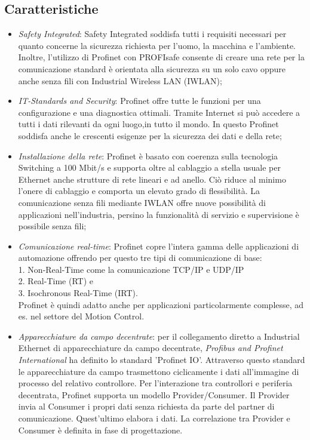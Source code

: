 \documentclass[12pt, a4paper, oneside]{book}
\begin{document}
\subsection{Caratteristiche}
\begin{itemize}
	\item \textit{Safety Integrated}: Safety Integrated soddisfa tutti i requisiti necessari per quanto concerne la sicurezza richiesta per l'uomo, la macchina e l'ambiente. Inoltre, l'utilizzo di Profinet con PROFIsafe consente di creare una rete per la comunicazione standard è orientata alla sicurezza su un solo cavo oppure anche senza fili con Industrial Wireless LAN (IWLAN);
	\item \textit{IT-Standards and Security}: Profinet offre tutte le funzioni per una configurazione e una diagnostica ottimali. Tramite Internet si può accedere a tutti i dati rilevanti da ogni luogo,in tutto il mondo. In questo Profinet soddisfa anche le crescenti esigenze per la sicurezza dei dati e della rete;
	\item \textit{Installazione della rete}: Profinet è basato con coerenza sulla tecnologia Switching a 100 Mbit/s e supporta oltre al cablaggio a stella usuale per Ethernet anche strutture di rete lineari e ad anello. Ciò riduce al minimo l'onere di cablaggio e comporta un elevato grado di flessibilità. La comunicazione senza fili mediante IWLAN offre nuove possibilità di applicazioni nell'industria, persino la funzionalità di servizio e supervisione è possibile senza fili;
	\item \textit{Comunicazione real-time}: Profinet copre l'intera gamma delle applicazioni di automazione offrendo per questo tre tipi di comunicazione di base:
	\\1. Non-Real-Time come la comunicazione TCP/IP e UDP/IP
	\\2. Real-Time (RT) e
	\\3. Isochronous Real-Time (IRT). 
	\\Profinet è quindi adatto anche per applicazioni particolarmente complesse, ad es. nel settore del Motion Control.
	\item \textit{Apparecchiature da campo decentrate}: per il collegamento diretto a Industrial Ethernet di apparecchiature da campo decentrate, \textit{Profibus and Profinet International} ha definito lo standard 'Profinet IO'. Attraverso questo standard le apparecchiature da campo trasmettono ciclicamente i dati all'immagine di processo del relativo controllore. Per l'interazione tra controllori e periferia decentrata, Profinet supporta un modello Provider/Consumer. Il Provider invia al Consumer i propri dati senza richiesta da parte del partner di comunicazione. Quest'ultimo elabora i dati. La correlazione tra Provider e Consumer è definita in fase di progettazione.

\end{itemize}
\end{document}
